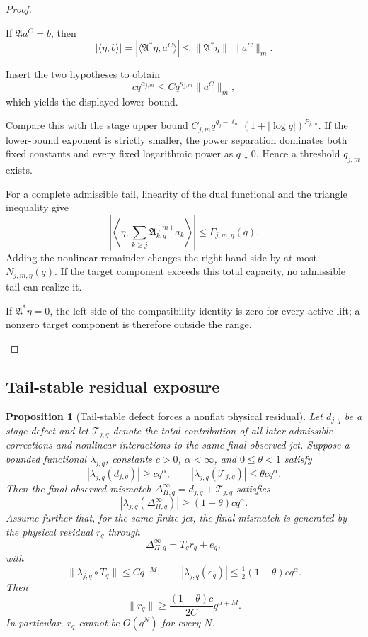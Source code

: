 \documentclass[12pt]{article}
\theoremstyle{plain}
\newtheorem{proposition}[theorem]{Proposition}
\theoremstyle{definition}
\theoremstyle{remark}
\newcommand{\Comp}{\mathfrak A}
\newcommand{\Obs}{\Pi}
\newcommand{\Tail}{\mathscr T}
\begin{document}
\begin{proof}
\begin{prooflines}
\item If \(\Comp a^C=b\), then
\[
|\langle\eta,b\rangle|=|\langle\Comp^*\eta,a^C\rangle|
\le\|\Comp^*\eta\|\,\|a^C\|_m.
\]
\item Insert the two hypotheses to obtain
\[
cq^{\alpha_{j,m}}\le Cq^{\kappa_{j,m}}\|a^C\|_m,
\]
which yields the displayed lower bound.
\item Compare this with the stage upper bound \(C_{j,m}q^{g_j-\ell_m}(1+|\log q|)^{P_{j,m}}\). If the lower-bound exponent is strictly smaller, the power separation dominates both fixed constants and every fixed logarithmic power as \(q\downarrow0\). Hence a threshold \(q_{j,m}\) exists.
\item For a complete admissible tail, linearity of the dual functional and the triangle inequality give
\[
\left|\left\langle\eta,\sum_{k\ge j}\Comp_{k,q}^{(m)}a_k\right\rangle\right|
\le\Gamma_{j,m,\eta}(q).
\]
Adding the nonlinear remainder changes the right-hand side by at most \(N_{j,m,\eta}(q)\). If the target component exceeds this total capacity, no admissible tail can realize it.
\item If \(\Comp^*\eta=0\), the left side of the compatibility identity is zero for every active lift; a nonzero target component is therefore outside the range.
\end{prooflines}
\end{proof}

\subsection{Tail-stable residual exposure}
\begin{proposition}[Tail-stable defect forces a nonflat physical residual]\label{prop:residual}
Let \(d_{j,q}\) be a stage defect and let \(\Tail_{j,q}\) denote the total contribution of all later admissible corrections and nonlinear interactions to the same final observed jet. Suppose a bounded functional \(\lambda_{j,q}\), constants \(c>0\), \(\alpha<\infty\), and \(0\le\theta<1\) satisfy
\[
|\lambda_{j,q}(d_{j,q})|\ge cq^\alpha,
\qquad
|\lambda_{j,q}(\Tail_{j,q})|\le\theta cq^\alpha.
\]
Then the final observed mismatch \(\Delta^{\infty}_{\Obs,q}=d_{j,q}+\Tail_{j,q}\) satisfies
\[
|\lambda_{j,q}(\Delta^{\infty}_{\Obs,q})|
\ge(1-\theta)cq^\alpha.
\]
Assume further that, for the same finite jet, the final mismatch is generated by the physical residual \(r_q\) through
\[
\Delta^{\infty}_{\Obs,q}=T_qr_q+e_q,
\]
with
\[
\|\lambda_{j,q}\circ T_q\|\le Cq^{-M},
\qquad
|\lambda_{j,q}(e_q)|\le\tfrac12(1-\theta)cq^\alpha.
\]
Then
\[
\boxed{\|r_q\|\ge \frac{(1-\theta)c}{2C}q^{\alpha+M}.}
\]
In particular, \(r_q\) cannot be \(O(q^N)\) for every \(N\).
\end{proposition}
\end{document}
